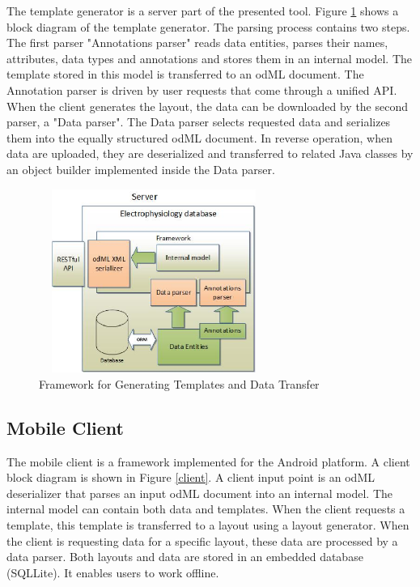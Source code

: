 \documentclass[a4paper,twoside]{article}
\begin{document}
The template generator is a server part of the presented tool. Figure \ref{framework} shows a block diagram of the template generator. The parsing process contains two steps. The first parser "Annotations parser" reads data entities, parses their names, attributes, data types and annotations and stores them in an internal model. The template stored in this model is transferred to an odML document. The Annotation parser is driven by user requests that come through a unified API. When the client generates the layout, the data can be downloaded by the second parser, a "Data parser". The Data parser selects requested data and serializes them into the equally structured odML document. In reverse operation,  when data are uploaded, they are deserialized and transferred to related Java classes by an object builder implemented inside the Data parser.

\begin{figure}
\centering\includegraphics[width=7.5cm, height=6cm]{Framework}
\caption{\label{framework}Framework for Generating Templates and Data Transfer}
\end{figure}

\subsection{Mobile Client}

The mobile client is a framework implemented for the Android platform. A client block diagram is shown in Figure \ref{client}. A client input point is an odML deserializer that parses an input odML document into an internal model. The internal model can contain both data and templates. When the client requests a template, this template is transferred to a layout using a layout generator. When the client is requesting data for a specific layout, these data are processed by a data parser. Both layouts and data are stored in an embedded database (SQLLite). It enables users to work offline.
\end{document}
